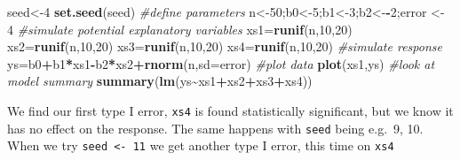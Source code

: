\documentclass[
]{book}
\newenvironment{Shaded}{\begin{snugshade}}{\end{snugshade}}
\newcommand{\AttributeTok}[1]{\textcolor[rgb]{0.13,0.29,0.53}{#1}}
\newcommand{\CommentTok}[1]{\textcolor[rgb]{0.56,0.35,0.01}{\textit{#1}}}
\newcommand{\DecValTok}[1]{\textcolor[rgb]{0.00,0.00,0.81}{#1}}
\newcommand{\FunctionTok}[1]{\textcolor[rgb]{0.13,0.29,0.53}{\textbf{#1}}}
\newcommand{\NormalTok}[1]{#1}
\newcommand{\OtherTok}[1]{\textcolor[rgb]{0.56,0.35,0.01}{#1}}
\newcommand{\SpecialCharTok}[1]{\textcolor[rgb]{0.81,0.36,0.00}{\textbf{#1}}}
\begin{document}
\begin{Shaded}
\begin{Highlighting}[]
\NormalTok{seed}\OtherTok{\textless{}{-}}\DecValTok{4}
\FunctionTok{set.seed}\NormalTok{(seed)}
\CommentTok{\#define parameters}
\NormalTok{n}\OtherTok{\textless{}{-}}\DecValTok{50}\NormalTok{;b0}\OtherTok{\textless{}{-}}\DecValTok{5}\NormalTok{;b1}\OtherTok{\textless{}{-}}\DecValTok{3}\NormalTok{;b2}\OtherTok{\textless{}{-}}\SpecialCharTok{{-}}\DecValTok{2}\NormalTok{;error }\OtherTok{\textless{}{-}} \DecValTok{4}
\CommentTok{\#simulate potential explanatory variables}
\NormalTok{xs1}\OtherTok{=}\FunctionTok{runif}\NormalTok{(n,}\DecValTok{10}\NormalTok{,}\DecValTok{20}\NormalTok{)}
\NormalTok{xs2}\OtherTok{=}\FunctionTok{runif}\NormalTok{(n,}\DecValTok{10}\NormalTok{,}\DecValTok{20}\NormalTok{)}
\NormalTok{xs3}\OtherTok{=}\FunctionTok{runif}\NormalTok{(n,}\DecValTok{10}\NormalTok{,}\DecValTok{20}\NormalTok{)}
\NormalTok{xs4}\OtherTok{=}\FunctionTok{runif}\NormalTok{(n,}\DecValTok{10}\NormalTok{,}\DecValTok{20}\NormalTok{)}
\CommentTok{\#simulate response}
\NormalTok{ys}\OtherTok{=}\NormalTok{b0}\SpecialCharTok{+}\NormalTok{b1}\SpecialCharTok{*}\NormalTok{xs1}\SpecialCharTok{{-}}\NormalTok{b2}\SpecialCharTok{*}\NormalTok{xs2}\SpecialCharTok{+}\FunctionTok{rnorm}\NormalTok{(n,}\AttributeTok{sd=}\NormalTok{error)}
\CommentTok{\#plot data}
\FunctionTok{plot}\NormalTok{(xs1,ys)}
\CommentTok{\#look at model summary}
\FunctionTok{summary}\NormalTok{(}\FunctionTok{lm}\NormalTok{(ys}\SpecialCharTok{\textasciitilde{}}\NormalTok{xs1}\SpecialCharTok{+}\NormalTok{xs2}\SpecialCharTok{+}\NormalTok{xs3}\SpecialCharTok{+}\NormalTok{xs4))}
\end{Highlighting}
\end{Shaded}

We find our first type I error, \texttt{xs4} is found statistically significant, but we know it has no effect on the response. The same happens with \texttt{seed} being e.g.~9, 10. When we try \texttt{seed\ \textless{}-\ 11} we get another type I error, this time on \texttt{xs4}
\end{document}
